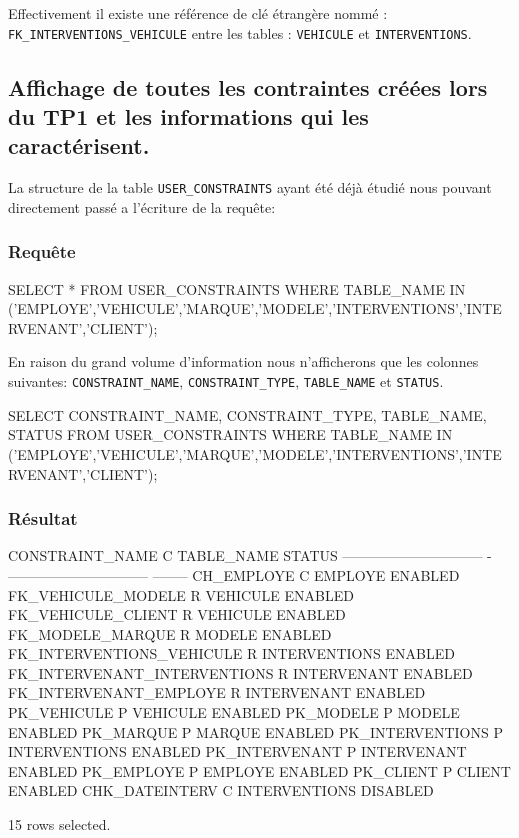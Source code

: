 \documentclass[•]{article}
\begin{document}
Effectivement il existe une référence de clé étrangère nommé : \texttt{FK\_INTERVENTIONS\_VEHICULE} entre les tables : \texttt{VEHICULE} et \texttt{INTERVENTIONS}. 

\subsection{Affichage de toutes les contraintes créées lors du TP1 et les informations qui les caractérisent.}
La structure de la table \texttt{USER\_CONSTRAINTS} ayant été déjà étudié nous pouvant directement passé a l'écriture de la requête: 

\subsubsection{Requête}
\begin{sql}
SELECT  *  
FROM USER_CONSTRAINTS 
WHERE TABLE_NAME IN ('EMPLOYE','VEHICULE','MARQUE','MODELE','INTERVENTIONS','INTERVENANT','CLIENT');
\end{sql}

En raison du grand volume d'information nous n'afficherons que les colonnes suivantes: \texttt{CONSTRAINT\_NAME}, \texttt{CONSTRAINT\_TYPE}, \texttt{TABLE\_NAME} et \texttt{STATUS}.

\begin{sql}
SELECT  CONSTRAINT_NAME, CONSTRAINT_TYPE, TABLE_NAME, STATUS  FROM USER_CONSTRAINTS WHERE TABLE_NAME IN ('EMPLOYE','VEHICULE','MARQUE','MODELE','INTERVENTIONS','INTERVENANT','CLIENT');
\end{sql}

\subsubsection{Résultat}
\begin{sql}

CONSTRAINT_NAME                C TABLE_NAME                     STATUS
------------------------------ - ------------------------------ --------
CH_EMPLOYE                     C EMPLOYE                        ENABLED
FK_VEHICULE_MODELE             R VEHICULE                       ENABLED
FK_VEHICULE_CLIENT             R VEHICULE                       ENABLED
FK_MODELE_MARQUE               R MODELE                         ENABLED
FK_INTERVENTIONS_VEHICULE      R INTERVENTIONS                  ENABLED
FK_INTERVENANT_INTERVENTIONS   R INTERVENANT                    ENABLED
FK_INTERVENANT_EMPLOYE         R INTERVENANT                    ENABLED
PK_VEHICULE                    P VEHICULE                       ENABLED
PK_MODELE                      P MODELE                         ENABLED
PK_MARQUE                      P MARQUE                         ENABLED
PK_INTERVENTIONS               P INTERVENTIONS                  ENABLED
PK_INTERVENANT                 P INTERVENANT                    ENABLED
PK_EMPLOYE                     P EMPLOYE                        ENABLED
PK_CLIENT                      P CLIENT                         ENABLED
CHK_DATEINTERV                 C INTERVENTIONS                  DISABLED

15 rows selected.
\end{sql}
\end{document}
